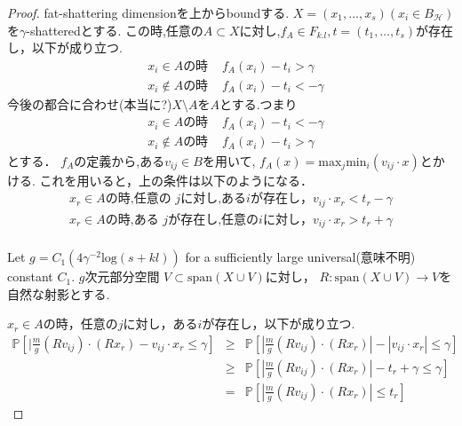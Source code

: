 \documentclass{ujarticle}
\begin{document}
\begin{proof}
  fat-shattering dimensionを上からboundする.
  $X=(x_1,\dots,x_s)(x_i \in B_{\mathcal{H}})$を$\gamma$-shatteredとする.
  この時,任意の$A \subset X$に対し,$f_A \in F_{k.l},t=(t_1,\dots,t_s)$が存在し，以下が成り立つ.
  \begin{eqnarray*}
& x_i \in A \mbox{の時 } &f_A(x_i) - t_i > \gamma   \\
&x_i \notin A \mbox{の時 }& f_A(x_i) -t_i < - \gamma
  \end{eqnarray*}
  今後の都合に合わせ(本当に?)$X \setminus A$を$A$とする.つまり
  \begin{eqnarray*}
& x_i \in A \mbox{の時 }  &f_A(x_i) - t_i < - \gamma   \\
& x_i \notin A \mbox{の時 }& f_A(x_i) -t_i > \gamma
  \end{eqnarray*}
とする．
  $f_A$の定義から,ある$v_{ij} \in B$を用いて,
  $f_A(x)=\mathrm{max}_j \mathrm{min}_i(v_{ij} \cdot x) $とかける.
これを用いると，上の条件は以下のようになる．
\begin{eqnarray*}
x_r \in A \mbox{の時,任意の }j\mbox{に対し,ある}i{が存在し，} v_{ij} \cdot x_r  < t_r - \gamma   \\
x_r \in A \mbox{の時,ある }j\mbox{が存在し,任意の}i{に対し，} v_{ij} \cdot x_r  > t_r + \gamma   \\
\end{eqnarray*}

  Let $g= C_1(4\gamma^{-2} \mathrm{log}(s + kl))$
  for a sufficiently large universal(意味不明) constant $C_1$.
$g$次元部分空間 $V \subset \mathrm{span}(X \cup V) $に対し，
$ R : \mathrm{span}(X \cup V) \to V$を自然な射影とする.


$x_r \in A$の時，任意の$j$に対し，ある$i$が存在し，以下が成り立つ.
\begin{eqnarray*}
  \mathbb{P} [ | \frac{m}{g}(Rv_{ij})\cdot (Rx_r) - v_{ij} \cdot  x_r \le  \gamma ]
  & \ge &  \mathbb{P} [ | \frac{m}{g}(Rv_{ij})\cdot (Rx_r)| - |v_{ij} \cdot  x_r| \le  \gamma ] \\
  & \ge &\mathbb{P} [ | \frac{m}{g}(Rv_{ij})\cdot (Rx_r)| - t_r + \gamma  \le  \gamma ] \\
  & = & \mathbb{P} [ | \frac{m}{g}(Rv_{ij})\cdot (Rx_r)| \le t_r  ]
\end{eqnarray*}


\end{proof}
\end{document}
